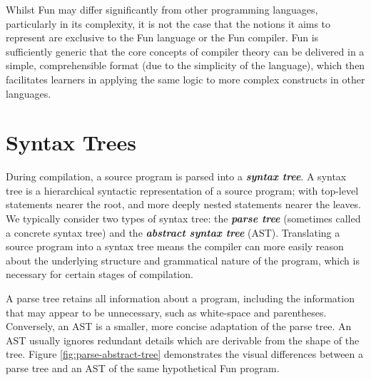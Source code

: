 \documentclass{l4proj}
\begin{document}
Whilst Fun may differ significantly from other programming languages, particularly in its complexity, it is not the case that the notions it aims to represent are exclusive to the Fun language or the Fun compiler. Fun is sufficiently generic that the core concepts of compiler theory can be delivered in a simple, comprehensible format (due to the simplicity of the language), which then facilitates learners in applying the same logic to more complex constructs in other languages.

\section{Syntax Trees}
During compilation, a source program is parsed into a \textit{\textbf{syntax tree}}. A syntax tree is a hierarchical syntactic representation of a source program; with top-level statements nearer the root, and more deeply nested statements nearer the leaves. We typically consider two types of syntax tree: the \textit{\textbf{parse tree}} (sometimes called a concrete syntax tree) and the \textit{\textbf{abstract syntax tree}} (AST). Translating a source program into a syntax tree means the compiler can more easily reason about the underlying structure and grammatical nature of the program, which is necessary for certain stages of compilation.

A parse tree retains all information about a program, including the information that may appear to be unnecessary, such as white-space and parentheses. Conversely, an AST is a smaller, more concise adaptation of the parse tree. An AST usually ignores redundant details which are derivable from the shape of the tree. Figure \ref{fig:parse-abstract-tree} demonstrates the visual differences between a parse tree and an AST of the same hypothetical Fun program. 
\end{document}
